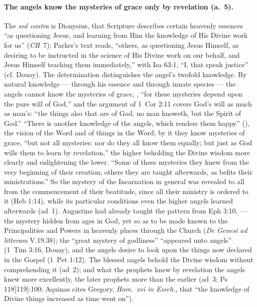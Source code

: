 \paragraph{The angels know the mysteries of grace only by revelation
(a.~5).} The \emph{sed contra} is Dionysius, that Scripture describes
certain heavenly essences ``as questioning Jesus, and learning from Him
the knowledge of His Divine work for us'' (\emph{CH}~7); Parker's text
reads, ``others, as questioning Jesus Himself, as desiring to be
instructed in the science of His Divine work on our behalf, and Jesus
Himself teaching them immediately,'' with Isa 63:1, ``I, that speak
justice'' (cf. Douay). The determination distinguishes the angel's twofold
knowledge. By natural knowledge --- through his essence and through innate
species --- the angels cannot know the mysteries of grace, , ``for these mysteries depend upon the pure will of God,'' and
the argument of 1~Cor 2:11 covers God's will as much as man's: ``the
things also that are of God, no man knoweth, but the Spirit of God.''
``There is another knowledge of the angels, which renders them happy''
(), the vision of
the Word and of things in the Word; by it they know mysteries of grace,
``but not all mysteries: nor do they all know them equally; but just as
God wills them to learn by revelation,'' the higher beholding the Divine
wisdom more clearly and enlightening the lower. ``Some of these mysteries
they knew from the very beginning of their creation; others they are
taught afterwards, as befits their ministrations.'' So the mystery of the
Incarnation in general was revealed to all from the commencement of their
beatitude, since all their ministry is ordered to it (Heb 1:14), while its
particular conditions even the higher angels learned afterwards (ad~1).
Augustine had already taught the pattern from Eph 3:10,  ---
the mystery hidden from ages in God, yet so as to be made known to the
Principalities and Powers in heavenly places through the Church
(\emph{De Genesi ad litteram} V.19.38); the ``great mystery of godliness''
``appeared unto angels'' (1~Tim 3:16, Douay), and the angels desire to
look upon the things now declared in the Gospel (1~Pet 1:12). The blessed
angels behold the Divine wisdom without comprehending it (ad~2); and what
the prophets knew by revelation the angels knew more excellently, the
later prophets more than the earlier (ad~3; Ps 118[119]:100; Aquinas cites
Gregory, \emph{Hom.~xvi in Ezech.}, that ``the knowledge of Divine things
increased as time went on'').

